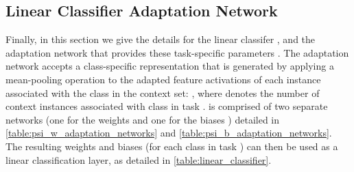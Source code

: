 \documentclass{article}
\theoremstyle{definition}
\begin{document}
\subsection{Linear Classifier Adaptation Network}
\label{app:linear_classifier}

Finally, in this section we give the details for the linear classifer , and the adaptation network that provides these task-specific parameters . The adaptation network accepts a class-specific representation that is generated by applying a mean-pooling operation to the adapted feature activations of each instance associated with the class in the context set: , where  denotes the number of context instances associated with class  in task .  is comprised of two separate networks (one for the weights   and one for the biases ) detailed in \cref{table:psi_w_adaptation_networks} and \cref{table:psi_b_adaptation_networks}. The resulting weights and biases (for each class in task ) can then be used as a linear classification layer, as detailed in \cref{table:linear_classifier}.

\begin{table}[!htb]
    \RawFloats
\end{table}
\end{document}
